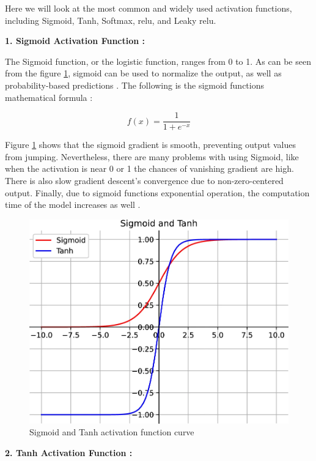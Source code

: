 Here we will look at the most common and widely used activation functions, including Sigmoid, Tanh, Softmax, \gls{relu}, and Leaky \gls{relu}.

\textbf{1. Sigmoid Activation Function :}

The Sigmoid function, or the logistic function, ranges from 0 to 1. As can be seen from the figure \ref{fig:sigmoid tanh function curve}, sigmoid can be used to normalize the output, as well as probability-based predictions \cite{Zhao2024}. The following is the sigmoid functions mathematical formula :

\[ 
    f(x) = \frac{1}{1 + e^{-x}}
\]

Figure \ref{fig:sigmoid tanh function curve} shows that the sigmoid gradient is smooth, preventing output values from jumping. Nevertheless, there are many problems with using Sigmoid, like when the activation is near 0 or 1 the chances of vanishing gradient are high. There is also slow gradient descent's convergence due to non-zero-centered output. Finally, due to sigmoid functions exponential operation, the computation time of the model increases as well \cite{Zhao2024}.


\begin{figure}[!ht]
    \centering
    \includegraphics[width=1\linewidth]{Rohit_Master_Thesis//Images/sigmoid_tanh_af.png}
    \caption{Sigmoid and Tanh activation function curve \cite{Zhao2024}}
    \label{fig:sigmoid tanh function curve}
\end{figure}

\textbf{2. Tanh Activation Function :}

